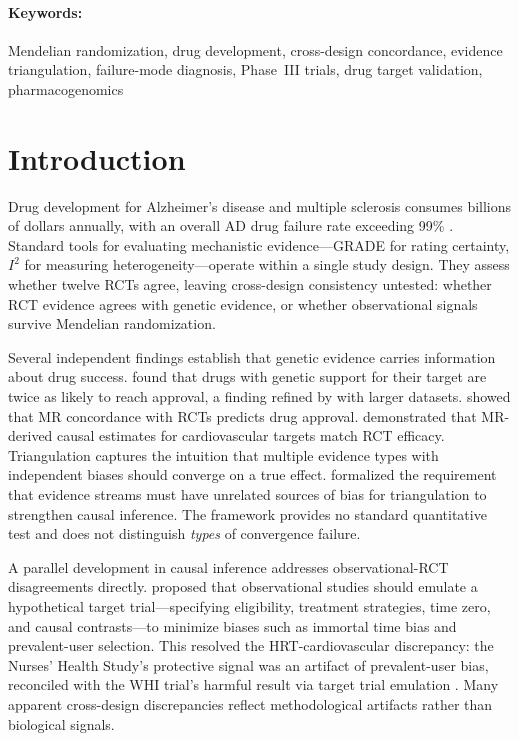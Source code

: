 \documentclass[11pt]{article}
\begin{document}
\paragraph{Keywords:} Mendelian randomization, drug development, cross-design concordance, evidence triangulation, failure-mode diagnosis, Phase~III trials, drug target validation, pharmacogenomics

\section{Introduction}

Drug development for Alzheimer's disease and multiple sclerosis consumes billions of dollars annually, with an overall AD drug failure rate exceeding 99\% \cite{cummings2014}. Standard tools for evaluating mechanistic evidence---GRADE for rating certainty, $I^2$ for measuring heterogeneity---operate within a single study design. They assess whether twelve RCTs agree, leaving cross-design consistency untested: whether RCT evidence agrees with genetic evidence, or whether observational signals survive Mendelian randomization.

Several independent findings establish that genetic evidence carries information about drug success. \citet{nelson2015} found that drugs with genetic support for their target are twice as likely to reach approval, a finding refined by \citet{minikel2024} with larger datasets. \citet{gill2021} showed that MR concordance with RCTs predicts drug approval. \citet{ference2019} demonstrated that MR-derived causal estimates for cardiovascular targets match RCT efficacy. Triangulation \cite{lawlor2016,munafo2018} captures the intuition that multiple evidence types with independent biases should converge on a true effect. \citet{hammerton2021} formalized the requirement that evidence streams must have unrelated sources of bias for triangulation to strengthen causal inference. The framework provides no standard quantitative test and does not distinguish \emph{types} of convergence failure.

A parallel development in causal inference addresses observational-RCT disagreements directly. \citet{hernan2016} proposed that observational studies should emulate a hypothetical target trial---specifying eligibility, treatment strategies, time zero, and causal contrasts---to minimize biases such as immortal time bias and prevalent-user selection. This resolved the HRT-cardiovascular discrepancy: the Nurses' Health Study's protective signal was an artifact of prevalent-user bias, reconciled with the WHI trial's harmful result via target trial emulation \cite{hernan2008}. Many apparent cross-design discrepancies reflect methodological artifacts rather than biological signals.
\end{document}
